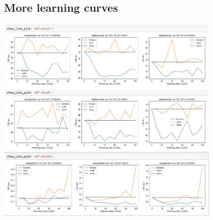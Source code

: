 \documentclass{beamer}
\begin{document}



\label{lc}
\subsection{More learning curves}
\begin{frame}[t]
  \vspace{-1em}
  \center \includegraphics[width=0.8\textwidth]{fig/dev_cer_all.png}
\end{frame}
\end{document}
